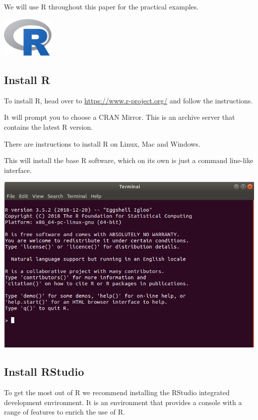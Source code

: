 \documentclass[]{book}
\begin{document}
We will use R throughout this paper for the practical examples.

\includegraphics[width=1in]{img/R}

\hypertarget{install-r}{%
\subsection{Install R}\label{install-r}}

To install R, head over to \url{https://www.r-project.org/} and follow the instructions.

It will prompt you to choose a CRAN Mirror. This is an archive server that
contains the latest R version.

There are instructions to install R on Linux, Mac and Windows.

This will install the base R software, which on its own is just a command line-like
interface.

\includegraphics[width=6.02in]{img/R_cmd}

\hypertarget{install-rstudio}{%
\subsection{Install RStudio}\label{install-rstudio}}

To get the most out of R we recommend installing the RStudio \citep{noauthor_rstudio_2019}
integrated development environment. It is an environment that provides a console
with a range of features to enrich the use of R.
\end{document}
